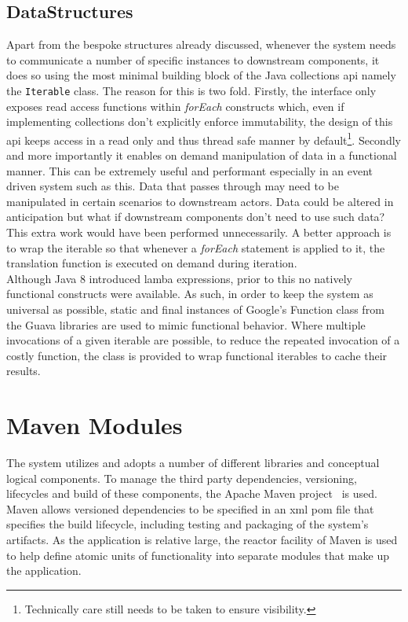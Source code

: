 \documentclass[a4paper,11pt]{scrreprt}
\begin{document}
\subsection{DataStructures}
Apart from the bespoke structures already discussed, whenever the system needs to communicate a number of specific instances to downstream components, it does so using the most minimal building block of the Java collections \acrshort{api} namely the \verb|Iterable| class. The reason for this is two fold. Firstly, the interface only exposes read access functions within \textit{forEach} constructs which, even if implementing collections don't explicitly enforce immutability, the design of this \acrshort{api} keeps access in a read only and thus thread safe manner by default\footnote{Technically care still needs to be taken to ensure visibility.}. Secondly and more importantly it enables on demand manipulation of data in a functional manner. This can be extremely useful and performant especially in an event driven system such as this. Data that passes through may need to be manipulated in certain scenarios to downstream actors. Data could be altered in anticipation but what if downstream components don't need to use such data? This extra work would have been performed unnecessarily. A better approach is to wrap the iterable so that whenever a \textit{forEach} statement is applied to it, the translation function is executed on demand during iteration. \\
Although Java 8 introduced lamba expressions, prior to this no natively functional constructs were available. As such, in order to keep the system as universal as possible, static and final instances of Google's Function class from the Guava libraries are used to mimic functional behavior. Where multiple invocations of a given iterable are possible, to reduce the repeated invocation of a costly function, the  class is provided to wrap functional iterables to cache their results.
\clearpage
\section{Maven Modules}
The system utilizes and adopts a number of different libraries and conceptual logical components. To manage the third party dependencies, versioning, lifecycles and build of these components, the Apache Maven project~\cite{maven} is used. Maven allows versioned dependencies to be specified in an \acrshort{xml} pom file that specifies the build lifecycle, including testing and packaging of the system's artifacts. As the application is relative large, the reactor facility of Maven is used to help define atomic units of functionality into separate modules that make up the application. 
\end{document}

